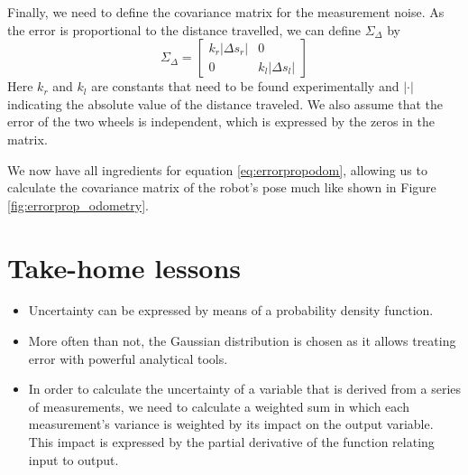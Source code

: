 Finally, we need to define the covariance matrix for the measurement noise. As the error is proportional to the distance travelled, we can define $ \Sigma_{\Delta}$ by
\begin{equation}
\Sigma_{\Delta}=\left[\begin{array}{cc}k_r|\Delta s_r| & 0\\0 & k_l|\Delta s_l|\end{array}\right]
\end{equation}
Here $ k_r$ and $ k_l$ are constants that need to be found experimentally and $ |\cdot |$ indicating the absolute value of the distance traveled. We also assume that the error of the two wheels is independent, which is expressed by the zeros in the matrix.

We now have all ingredients for equation \ref{eq:errorpropodom}, allowing us to calculate the covariance matrix of the robot's pose much like shown in Figure \ref{fig:errorprop_odometry}.

\section{Take-home lessons}
\begin{itemize}
\item Uncertainty can be expressed by means of a probability density function.
\item More often than not, the Gaussian distribution is chosen as it allows treating error with powerful analytical tools.
\item In order to calculate the uncertainty of a variable that is derived from a series of measurements, we need to calculate a weighted sum in which each measurement's variance is weighted by its impact on the output variable. This impact is expressed by the partial derivative of the function relating input to output.
\end{itemize}

